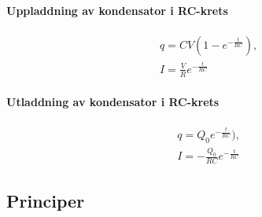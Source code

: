 \paragraph{Uppladdning av kondensator i RC-krets}
\begin{align*}
	&q = CV(1 - e^{-\frac{t}{RC}}), \\
	&I = \frac{V}{R}e^{-\frac{t}{RC}}
\end{align*}

\deriv

\paragraph{Utladdning av kondensator i RC-krets}
\begin{align*}
	&q = Q_0e^{-\frac{t}{RC}}), \\
	&I = -\frac{Q_0}{RC}e^{-\frac{t}{RC}}
\end{align*}

\subsection{Principer}